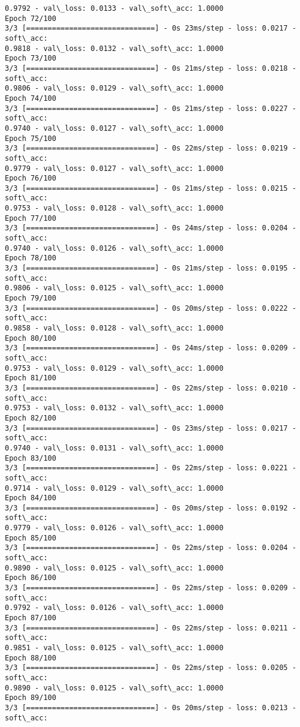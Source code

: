 \documentclass[11pt]{article}
\begin{document}
\begin{Verbatim}[commandchars=\\\{\}]
0.9792 - val\_loss: 0.0133 - val\_soft\_acc: 1.0000
Epoch 72/100
3/3 [==============================] - 0s 23ms/step - loss: 0.0217 - soft\_acc:
0.9818 - val\_loss: 0.0132 - val\_soft\_acc: 1.0000
Epoch 73/100
3/3 [==============================] - 0s 21ms/step - loss: 0.0218 - soft\_acc:
0.9806 - val\_loss: 0.0129 - val\_soft\_acc: 1.0000
Epoch 74/100
3/3 [==============================] - 0s 21ms/step - loss: 0.0227 - soft\_acc:
0.9740 - val\_loss: 0.0127 - val\_soft\_acc: 1.0000
Epoch 75/100
3/3 [==============================] - 0s 22ms/step - loss: 0.0219 - soft\_acc:
0.9779 - val\_loss: 0.0127 - val\_soft\_acc: 1.0000
Epoch 76/100
3/3 [==============================] - 0s 21ms/step - loss: 0.0215 - soft\_acc:
0.9753 - val\_loss: 0.0128 - val\_soft\_acc: 1.0000
Epoch 77/100
3/3 [==============================] - 0s 24ms/step - loss: 0.0204 - soft\_acc:
0.9740 - val\_loss: 0.0126 - val\_soft\_acc: 1.0000
Epoch 78/100
3/3 [==============================] - 0s 21ms/step - loss: 0.0195 - soft\_acc:
0.9806 - val\_loss: 0.0125 - val\_soft\_acc: 1.0000
Epoch 79/100
3/3 [==============================] - 0s 20ms/step - loss: 0.0222 - soft\_acc:
0.9858 - val\_loss: 0.0128 - val\_soft\_acc: 1.0000
Epoch 80/100
3/3 [==============================] - 0s 24ms/step - loss: 0.0209 - soft\_acc:
0.9753 - val\_loss: 0.0129 - val\_soft\_acc: 1.0000
Epoch 81/100
3/3 [==============================] - 0s 22ms/step - loss: 0.0210 - soft\_acc:
0.9753 - val\_loss: 0.0132 - val\_soft\_acc: 1.0000
Epoch 82/100
3/3 [==============================] - 0s 23ms/step - loss: 0.0217 - soft\_acc:
0.9740 - val\_loss: 0.0131 - val\_soft\_acc: 1.0000
Epoch 83/100
3/3 [==============================] - 0s 22ms/step - loss: 0.0221 - soft\_acc:
0.9714 - val\_loss: 0.0129 - val\_soft\_acc: 1.0000
Epoch 84/100
3/3 [==============================] - 0s 20ms/step - loss: 0.0192 - soft\_acc:
0.9779 - val\_loss: 0.0126 - val\_soft\_acc: 1.0000
Epoch 85/100
3/3 [==============================] - 0s 22ms/step - loss: 0.0204 - soft\_acc:
0.9890 - val\_loss: 0.0125 - val\_soft\_acc: 1.0000
Epoch 86/100
3/3 [==============================] - 0s 22ms/step - loss: 0.0209 - soft\_acc:
0.9792 - val\_loss: 0.0126 - val\_soft\_acc: 1.0000
Epoch 87/100
3/3 [==============================] - 0s 22ms/step - loss: 0.0211 - soft\_acc:
0.9851 - val\_loss: 0.0125 - val\_soft\_acc: 1.0000
Epoch 88/100
3/3 [==============================] - 0s 22ms/step - loss: 0.0205 - soft\_acc:
0.9890 - val\_loss: 0.0125 - val\_soft\_acc: 1.0000
Epoch 89/100
3/3 [==============================] - 0s 20ms/step - loss: 0.0213 - soft\_acc:

\end{Verbatim}
\end{document}
